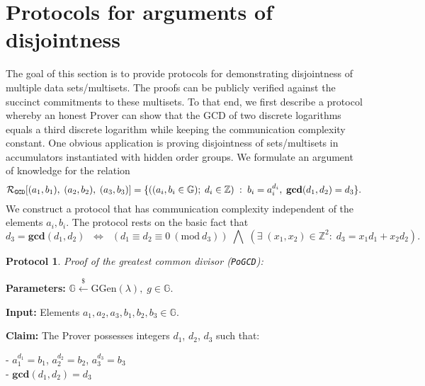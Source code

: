 \documentclass[11pt, lettersize, notitlepage, leqno, footskip=0.6cm]{article}
\newcommand{\bz}{\mathbb Z}
\newcommand{\ttt}{\texttt}
\newcommand{\LRA}{\Longleftrightarrow}
\newcommand{\mc}{\mathcal}
\newcommand{\mb}{\mathbb}
\newcommand{\mbf}{\mathbf}
\newcommand{\mr}{\mathrm}
\newcommand{\lamb}{\lambda}
\newcommand{\vs}{\vspace{-0.15cm}}
\newcommand{\noin}{\noindent}
\newcommand{\Mod}[1]{\ (\mathrm{mod}\ #1)}
\newcommand{\GCD}{\mbf{gcd}}
\newtheorem{Prot}[Thm]{Protocol}
\numberwithin{equation}{section}
\begin{document}
\section{\fontsize{12}{12}\selectfont Protocols for arguments of disjointness}

The goal of this section is to provide protocols for demonstrating disjointness of multiple data sets/multisets. The proofs can be publicly verified against the succinct commitments to these multisets. To that end, we first describe a protocol whereby an honest Prover can show that the GCD of two discrete logarithms equals a third discrete logarithm while keeping the communication complexity constant. One obvious application is proving disjointness of sets/multisets in accumulators instantiated with hidden order groups. We formulate an argument of knowledge for the relation \vs  $$\mc{R}_{{\ttt{GCD}}}[(a_1,b_1),\;(a_2,b_2),\;(a_3,b_3)] = \{((a_i, b_i\in\mb{G});\;d_i\in\bz)\;:\; b_i = a_i^{d_i},\;\GCD(d_1,d_2)=d_3  \} . \vs $$ We construct a protocol that has communication complexity independent of the elements $a_i, b_i$. The protocol rests on the basic fact that \vs $$d_3 = \GCD(d_1, d_2)\;\; \LRA \;\;(d_1\equiv d_2\equiv 0 \Mod{d_3})\;\bigwedge \; \left(\exists \; (x_1,x_2)\in \bz^2:\; d_3 = x_1d_1+x_2d_2  \right).$$
 

\begin{Prot} \normalfont \hypertarget{GCD}{\textit{Proof of the greatest common divisor}} (\verb|PoGCD|):\end{Prot} \vspace{-0.3cm}

\noin \textbf{Parameters:} $\mb{G}\xleftarrow{\$} \mr{GGen}(\lamb), \; g\in \mb{G}$.

\noin \textbf{Input:} Elements $a_1, a_2, a_3, b_1, b_2, b_3 \in \mb{G}$.

\noin \textbf{Claim:} The Prover possesses integers $d_1$, $d_2$, $d_3$ such that:

\noin - $a_1^{d_1} = b_1$, $a_2^{d_2} = b_2$, $a_3^{d_3} = b_3$\\
\noin - $\GCD(d_1, d_2) = d_3$
 
\end{document}
